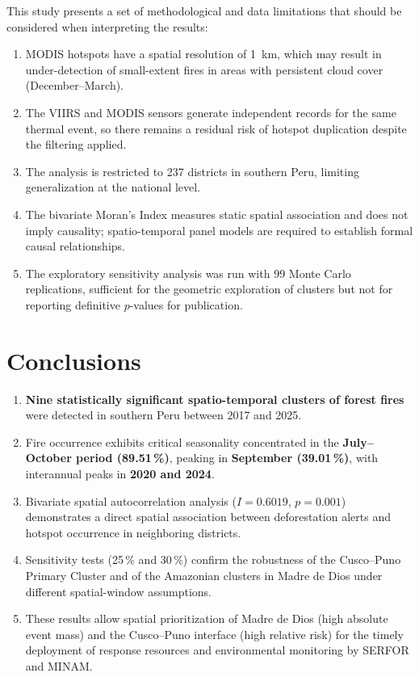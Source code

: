 \documentclass[preprint,12pt,authoryear]{elsarticle}
\begin{document}
	This study presents a set of methodological and data limitations
	that should be considered when interpreting the results:
	\begin{enumerate}[leftmargin=*, label=(\roman*)]
		\item MODIS hotspots have a spatial resolution of 1~km, which may
		result in under-detection of small-extent fires in areas
		with persistent cloud cover (December--March).
		\item The VIIRS and MODIS sensors generate independent records for
		the same thermal event, so there remains a residual risk of
		hotspot duplication despite the filtering applied.
		\item The analysis is restricted to 237 districts in southern
		Peru, limiting generalization at the national level.
		\item The bivariate Moran's Index measures static spatial
		association and does not imply causality; spatio-temporal
		panel models are required to establish formal causal
		relationships.
		\item The exploratory sensitivity analysis was run with 99 Monte
		Carlo replications, sufficient for the geometric exploration
		of clusters but not for reporting definitive $p$-values for
		publication.
	\end{enumerate}
	
	\section{Conclusions}
	
	\begin{enumerate}[leftmargin=*, label=\arabic*.]
		\item \textbf{Nine statistically significant spatio-temporal
			clusters of forest fires} were detected in southern Peru
		between 2017 and 2025.
		
		\item Fire occurrence exhibits critical seasonality concentrated
		in the \textbf{July--October period (89.51\,\%)}, peaking in
		\textbf{September (39.01\,\%)}, with interannual peaks in
		\textbf{2020 and 2024}.
		
		\item Bivariate spatial autocorrelation analysis ($I = 0.6019$,
		$p = 0.001$) demonstrates a direct spatial association
		between deforestation alerts and hotspot occurrence in
		neighboring districts.
		
		\item Sensitivity tests (25\,\% and 30\,\%) confirm the robustness
		of the Cusco--Puno Primary Cluster and of the Amazonian
		clusters in Madre de Dios under different spatial-window
		assumptions.
		
		\item These results allow spatial prioritization of Madre de Dios
		(high absolute event mass) and the Cusco--Puno interface
		(high relative risk) for the timely deployment of response
		resources and environmental monitoring by SERFOR and MINAM.
	\end{enumerate}
	
\end{document}
